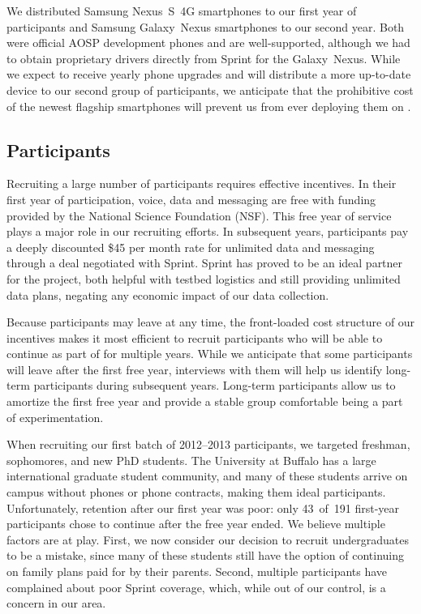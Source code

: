 We distributed Samsung Nexus~S~4G smartphones to our first year of
participants and Samsung Galaxy~Nexus smartphones to our second year. Both
were official AOSP development phones and are well-supported, although we had
to obtain proprietary drivers directly from Sprint for the Galaxy~Nexus.
While we expect to receive yearly phone upgrades and will distribute a more
up-to-date device to our second group of participants, we anticipate that the
prohibitive cost of the newest flagship smartphones will prevent us from ever
deploying them on \PhoneLab{}.



\subsection{Participants}

Recruiting a large number of \PhoneLab{} participants requires effective
incentives. In their first year of \PhoneLab{} participation, voice, data and
messaging are free with funding provided by the National Science Foundation
(NSF). This free year of service plays a major role in our recruiting
efforts. In subsequent years, participants pay a deeply discounted \$45 per
month rate for unlimited data and messaging through a deal negotiated with
Sprint. Sprint has proved to be an ideal partner for the \PhoneLab{} project,
both helpful with testbed logistics and still providing unlimited data plans,
negating any economic impact of our data collection.

Because participants may leave at any time, the front-loaded cost structure
of our incentives makes it most efficient to recruit participants who will be
able to continue as part of \PhoneLab{} for multiple years. While we
anticipate that some participants will leave after the first free year,
interviews with them will help us identify long-term participants during
subsequent years. Long-term participants allow us to amortize the first free
year and provide a stable group comfortable being a part of \PhoneLab{}
experimentation.

When recruiting our first batch of 2012--2013 participants, we targeted
freshman, sophomores, and new PhD students. The University at Buffalo has a
large international graduate student community, and many of these students
arrive on campus without phones or phone contracts, making them ideal
\PhoneLab{} participants. Unfortunately, retention after our first year was
poor: only 43~of~191 first-year participants chose to continue after the free
year ended. We believe multiple factors are at play. First, we now consider
our decision to recruit undergraduates to be a mistake, since many of these
students still have the option of continuing on family plans paid for by
their parents. Second, multiple participants have complained about poor
Sprint coverage, which, while out of our control, is a concern in our area.

